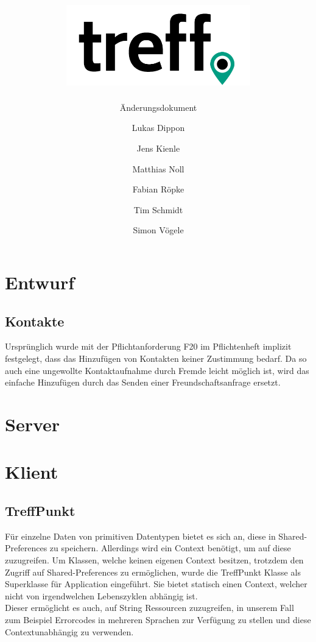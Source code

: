 \documentclass[parskip=full,11pt]{scrartcl}
\title{\includegraphics[width = 80mm]{images/logo_crop.png}}
\subtitle{\huge Änderungsdokument}
\author{Lukas Dippon
        \and Jens Kienle
        \and Matthias Noll
        \and Fabian Röpke
        \and Tim Schmidt
        \and Simon Vögele}
\begin{document}
\maketitle
\thispagestyle{empty} %

\pagebreak
\tableofcontents

\pagebreak
\section{Entwurf}

\subsection{Kontakte}
Ursprünglich wurde mit der Pflichtanforderung F20 im Pflichtenheft implizit 
festgelegt, dass das Hinzufügen von Kontakten keiner Zustimmung bedarf. Da so 
auch eine ungewollte Kontaktaufnahme durch Fremde leicht möglich ist, wird das 
einfache Hinzufügen durch das Senden einer Freundschaftsanfrage ersetzt.



\pagebreak
\section{Server}



\pagebreak
\section{Klient}

\subsection{TreffPunkt}
Für einzelne Daten von primitiven Datentypen bietet es sich an, diese in
Shared-Preferences zu speichern. Allerdings wird ein Context benötigt, um auf
diese zuzugreifen. Um Klassen, welche keinen eigenen Context besitzen, trotzdem
den Zugriff auf Shared-Preferences zu ermöglichen, wurde die TreffPunkt Klasse
als Superklasse für Application eingeführt. Sie bietet statisch einen Context,
welcher nicht von irgendwelchen Lebenszyklen abhängig ist.\\
Dieser ermöglicht es auch, auf String Ressourcen zuzugreifen, in unserem Fall
zum Beispiel Errorcodes in mehreren Sprachen zur Verfügung zu stellen und diese
Contextunabhängig zu verwenden.
\end{document}
